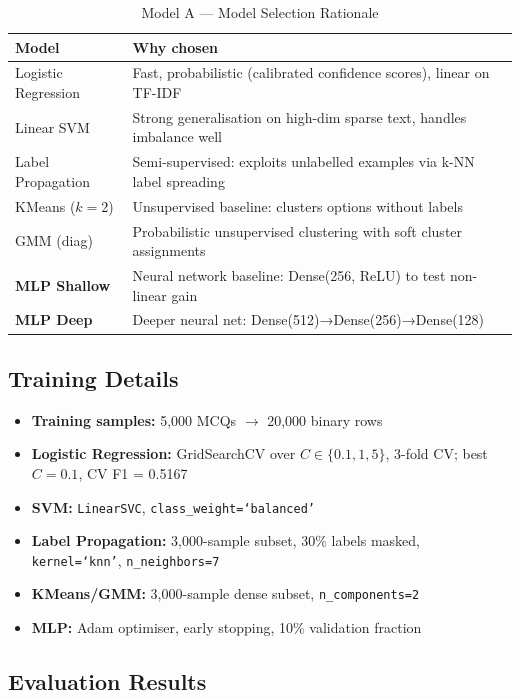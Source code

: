 \documentclass[12pt,a4paper]{article}
\begin{document}
\begin{table}[H]
\centering
\caption{Model A — Model Selection Rationale}
\begin{tabular}{lp{9cm}}
  \toprule
  \textbf{Model} & \textbf{Why chosen} \\
  \midrule
  Logistic Regression  & Fast, probabilistic (calibrated confidence scores), linear on TF-IDF \\
  Linear SVM           & Strong generalisation on high-dim sparse text, handles imbalance well \\
  Label Propagation    & Semi-supervised: exploits unlabelled examples via k-NN label spreading \\
  KMeans ($k=2$)       & Unsupervised baseline: clusters options without labels \\
  GMM (diag)           & Probabilistic unsupervised clustering with soft cluster assignments \\
  \textbf{MLP Shallow} & Neural network baseline: Dense(256, ReLU) to test non-linear gain \\
  \textbf{MLP Deep}    & Deeper neural net: Dense(512)→Dense(256)→Dense(128) \\
  \bottomrule
\end{tabular}
\end{table}

\subsection{Training Details}

\begin{itemize}
  \item \textbf{Training samples:} 5,000 MCQs $\to$ 20,000 binary rows
  \item \textbf{Logistic Regression:} GridSearchCV over $C \in \{0.1, 1, 5\}$,
        3-fold CV; best $C = 0.1$, CV F1 = 0.5167
  \item \textbf{SVM:} \texttt{LinearSVC}, \texttt{class\_weight=`balanced'}
  \item \textbf{Label Propagation:} 3,000-sample subset, 30\% labels masked,
        \texttt{kernel=`knn'}, \texttt{n\_neighbors=7}
  \item \textbf{KMeans/GMM:} 3,000-sample dense subset, \texttt{n\_components=2}
  \item \textbf{MLP:} Adam optimiser, early stopping, 10\% validation fraction
\end{itemize}

\subsection{Evaluation Results}
\end{document}
